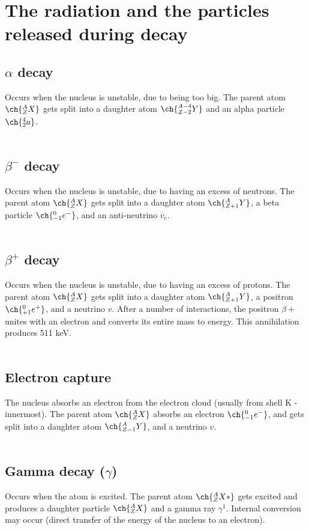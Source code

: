 \section{The radiation and the particles released during decay}
\subsection{$\alpha$ decay} Occurs when the nucleus is unstable, due to being too big. The parent atom $\ch{^{A}_{Z}X}$ gets split into a daughter atom $\ch{^{A-4}_{Z-2}Y}$ and an alpha particle $\ch{^{4}_{2}a}$.\\\\
\subsection{$\beta^{-}$ decay} Occurs when the nucleus is unstable, due to having an excess of neutrons. The parent atom $\ch{^{A}_{Z}X}$ gets split into a daughter atom $\ch{^{A}_{Z+1}Y}$, a beta particle $\ch{^{0}_{-1}e^{-}}$, and an anti-neutrino $\overline{v}_e$.\\\\
\subsection{$\beta^{+}$ decay} Occurs when the nucleus is unstable, due to having an excess of protons. The parent atom $\ch{^{A}_{Z}X}$ gets split into a daughter atom $\ch{^{A}_{Z+1}Y}$, a positron $\ch{^{0}_{+1}e^{+}}$, and a neutrino $v$. After a number of interactions, the positron $\beta{+}$ unites with an electron and converts its entire mass to energy. This annihilation produces 511 keV.\\\\
\subsection{Electron capture} The nucleus absorbs an electron from the electron cloud (usually from shell K -innermost). The parent atom $\ch{^{A}_{Z}X}$ absorbs an electron $\ch{^{0}_{-1}e^{-}}$, and gets split into a daughter atom $\ch{^{A}_{Z-1}Y}$, and a neutrino $v$.\\\\
\subsection{Gamma decay ($\gamma$)} Occurs when the atom is excited. The parent atom $\ch{^{A}_{Z}X*}$ gets excited and produces a daughter particle $\ch{^{A}_{Z}X}$ and a gamma ray $\gamma^{1}$. Internal conversion may occur (direct transfer of the energy of the nucleus to an electron).
